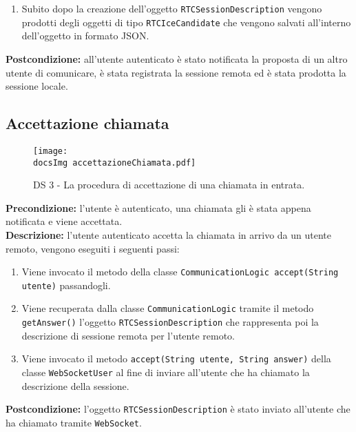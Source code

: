 \begin{sloppypar}
\begin{enumerate}
	\item Subito dopo la creazione dell'oggetto \texttt{RTCSessionDescription} vengono prodotti degli oggetti di tipo \texttt{RTCIceCandidate} che vengono salvati all'interno dell'oggetto in formato JSON.
\end{enumerate}
\textbf{Postcondizione: } all'utente autenticato è stato notificata la proposta di un altro utente di comunicare, è stata registrata la sessione remota ed è stata prodotta la sessione locale.
\newpage



\subsection{Accettazione chiamata}
\begin{center}
				\begin{figure}[h!tbp]
					\centering
					\texttt{[image: \\docsImg  accettazioneChiamata.pdf]}
				\caption{DS 3 - La procedura di accettazione di una chiamata in entrata.}	
				\end{figure}
			\end{center}
\noindent \textbf{Precondizione: }l'utente è autenticato, una chiamata gli è stata appena notificata e viene accettata.\\
\textbf{Descrizione: }l'utente autenticato accetta la chiamata in arrivo da un utente remoto, vengono eseguiti i seguenti passi:
\begin{enumerate}
	\item Viene invocato il metodo della classe \texttt{CommunicationLogic accept(String utente)} passandogli.
	\item Viene recuperata dalla classe \texttt{CommunicationLogic} tramite il metodo \texttt{getAnswer()} l'oggetto \texttt{RTCSessionDescription} che rappresenta poi la descrizione di sessione remota per l'utente remoto.
	\item Viene invocato il metodo \texttt{accept(String utente, String answer)} della classe \texttt{WebSocketUser} al fine di inviare all'utente che ha chiamato la descrizione della sessione.
	\end{enumerate}
\textbf{Postcondizione: } l'oggetto \texttt{RTCSessionDescription} è stato inviato all'utente che ha chiamato tramite \texttt{WebSocket}.
\newpage




\end{sloppypar}
